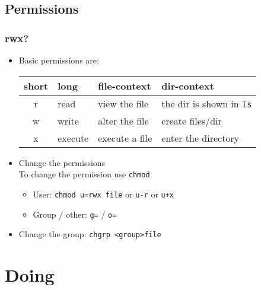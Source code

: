 \documentclass[handout]{beamer}
\newcommand{\code}[1]{\colorbox{lGray}{\texttt{#1}}}
\begin{document}
    \subsection{Permissions}
        \begin{frame}
			\frametitle{rwx?}
			\begin{itemize}
                \item<1-> Basic permissions are: \\
                \begin{tabular}{clll}
                    short & long & file-context & dir-context \\ \hline
                    r & read & view the file & the dir is shown in \code{ls} \\
                    w & write & alter the file & create files/dir \\
                    x & execute & execute a file & enter the directory
                \end{tabular}
                \item<2-> Change the permissions \\
                To change the permission use \code{chmod}
                \begin{itemize}
                    \item<3-> User: \code{chmod u=rwx file} or \code{u-r} or \code{u+x}
                    \item<4-> Group / other: \code{g=} / \code{o=}
                \end{itemize}
                \item<5-> Change the group: \code{chgrp \textless group\textgreater file}
            \end{itemize}
		\end{frame}
\section{Doing}
\end{document}
